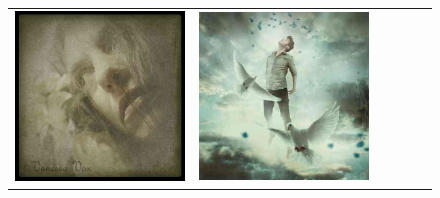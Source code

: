 \begin{figure}
\begin{minipage}[t]{\textwidth}
\begin{tabular}{m{.01\linewidth} m{.16\linewidth} m{.16\linewidth} m{.16\linewidth} m{.16\linewidth} m{.16\linewidth}}
    \includegraphics[width=\linewidth]{../style/figures/flickr_on_flickr/pred_style_Ethereal/3.jpg} &
    \includegraphics[width=\linewidth]{../style/figures/flickr_on_flickr/pred_style_Ethereal/4.jpg} \\

\end{tabular}
\end{minipage}
\end{figure}
